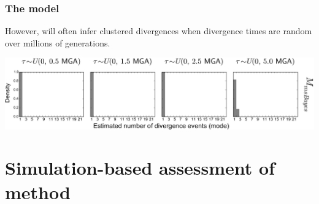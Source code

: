 \begin{frame}
    \frametitle{The \msb model}
    However, \msb will often infer clustered divergences when divergence times
    are random over millions of generations.

    \vspace{1cm}
        \centerline{
        \includegraphics[width=1.13\textwidth]{../images/old_old_power_psi_mode.pdf}}
\end{frame}

\section{Simulation-based assessment of method}


